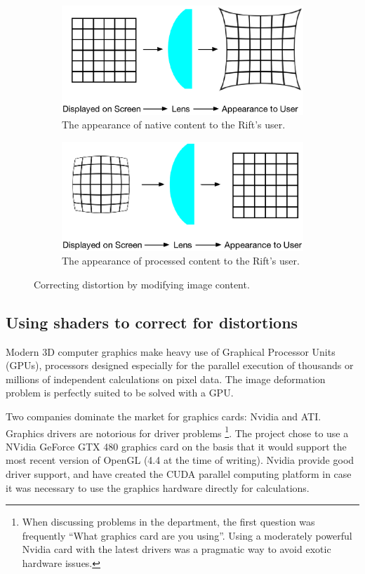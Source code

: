 \documentclass[MSc,paper=a4,pagesize=auto]{icldt}
\begin{document}
\begin{figure}[htbp!]
\centering
\begin{subfigure}{0.8\textwidth}
    \centering
    \includegraphics[width=0.8\linewidth]{resources/appearance_unprocessed}
    \caption{The appearance of native content to the Rift's user.}
	\label{fig:appearance_unprocessed}
\end{subfigure}
\centering
\begin{subfigure}{0.8\textwidth}
    \centering
    \includegraphics[width=0.8\linewidth]{resources/appearance_processed}
    \caption{The appearance of processed content to the Rift's user.}
	\label{fig:appearance_processed}
\end{subfigure}    
    \caption{Correcting distortion by modifying image content.}
    \label{fig:processing_content}
\end{figure}

\subsection{Using shaders to correct for distortions}
Modern 3D computer graphics make heavy use of Graphical Processor Units (GPUs), processors designed especially for the parallel execution of thousands or millions of independent calculations on pixel data. The image deformation problem is perfectly suited to be solved with a GPU. 

Two companies dominate the market for graphics cards: Nvidia and ATI. Graphics drivers are notorious for driver problems \footnote{When discussing problems in the department, the first question was frequently ``What graphics card are you using''. Using a moderately powerful Nvidia card with the latest drivers was a pragmatic way to avoid exotic hardware issues.}. The project chose to use a NVidia GeForce GTX 480 graphics card on the basis that it would support the most recent version of OpenGL (4.4 at the time of writing). Nvidia provide good driver support, and have created the CUDA parallel computing platform in case it was necessary to use the graphics hardware directly for calculations.
\end{document}
